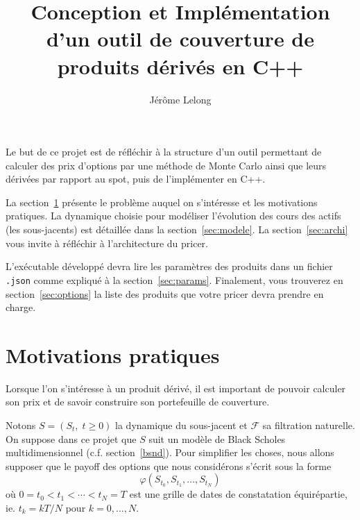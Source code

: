 \documentclass[a4paper,11pt]{article}
\title{Conception et Implémentation d'un outil de couverture de produits dérivés en C++}
\author{Jérôme Lelong}
\def\cf{{\mathcal F}}
\begin{document}
\maketitle

Le but de ce projet  est de réfléchir à la structure d'un outil permettant de calculer des prix d'options par une méthode de Monte Carlo ainsi que leurs dérivées par rapport au spot, puis de l'implémenter en C++.

La section~\ref{sec:motiv} présente le problème auquel on s'intéresse et les motivations pratiques. La dynamique choisie pour modéliser l'évolution des cours des actifs (les sous-jacents) est détaillée dans la section~\ref{sec:modele}. La section~\ref{sec:archi} vous invite à réfléchir à l'architecture du pricer.

L'exécutable développé devra lire les paramètres des produits dans un fichier \verb!.json! comme expliqué à la section~\ref{sec:params}. Finalement, vous trouverez en section~\ref{sec:options} la liste des produits que votre pricer devra prendre en charge.

\section{Motivations pratiques}
\label{sec:motiv}

Lorsque l'on s'intéresse à un produit dérivé, il est important de pouvoir calculer son prix et de savoir construire son portefeuille de couverture.

Notons $S = (S_t, \; t \ge 0)$ la dynamique du sous-jacent et $\cf$ sa filtration naturelle. On suppose dans ce projet que $S$ suit un modèle de Black Scholes multidimensionnel (c.f.  section~\ref{bsnd}).  Pour simplifier les choses, nous allons supposer que le payoff des options que nous considérons s'écrit sous la forme
\begin{equation*}
 \varphi(S_{t_0}, S_{t_1}, \dots, S_{t_N})
\end{equation*}
où $0 = t_0 < t_1 < \cdots < t_N = T$ est une grille de dates de constatation équirépartie, ie. $t_k = kT / N$ pour $k=0,\dots, N$.
\end{document}
